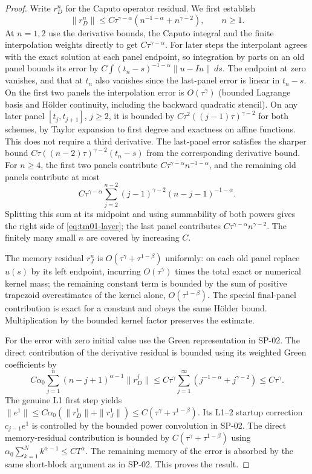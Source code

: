 \documentclass[11pt,a4paper]{amsart}
\theoremstyle{remark}
\theoremstyle{plain}
\theoremstyle{remark}
\numberwithin{equation}{section}
\begin{document}
\begin{proof}
Write $r_D^n$ for the Caputo operator residual. We first establish
\begin{equation}\label{eq:tm01-layer}
 \|r_D^n\|\le C\tau^{\gamma-\alpha}(n^{-1-\alpha}+n^{\gamma-2}),\qquad n\ge1.
\end{equation}
At $n=1,2$ use the derivative bounds, the Caputo integral and the finite interpolation weights directly to get $C\tau^{\gamma-\alpha}$. For later steps the interpolant agrees with the exact solution at each panel endpoint, so integration by parts on an old panel bounds its error by $C\int (t_n-s)^{-1-\alpha}\|u-Iu\|\,ds$. The endpoint at zero vanishes, and that at $t_n$ also vanishes since the last-panel error is linear in $t_n-s$. On the first two panels the interpolation error is $O(\tau^\gamma)$ (bounded Lagrange basis and H\"older continuity, including the backward quadratic stencil). On any later panel $[t_j,t_{j+1}]$, $j\ge2$, it is bounded by $C\tau^2((j-1)\tau)^{\gamma-2}$ for both schemes, by Taylor expansion to first degree and exactness on affine functions. This does not require a third derivative. The last-panel error satisfies the sharper bound $C\tau((n-2)\tau)^{\gamma-2}(t_n-s)$ from the corresponding derivative bound. For $n\ge4$, the first two panels contribute $C\tau^{\gamma-\alpha}n^{-1-\alpha}$, and the remaining old panels contribute at most
\[
 C\tau^{\gamma-\alpha}\sum_{j=2}^{n-2}(j-1)^{\gamma-2}(n-j-1)^{-1-\alpha}.
\]
Splitting this sum at its midpoint and using summability of both powers gives the right side of \eqref{eq:tm01-layer}; the last panel contributes $C\tau^{\gamma-\alpha}n^{\gamma-2}$. The finitely many small $n$ are covered by increasing $C$.

The memory residual $r_J^n$ is $O(\tau^\gamma+\tau^{1-\beta})$ uniformly: on each old panel replace $u(s)$ by its left endpoint, incurring $O(\tau^\gamma)$ times the total exact or numerical kernel mass; the remaining constant term is bounded by the sum of positive trapezoid overestimates of the kernel alone, $O(\tau^{1-\beta})$. The special final-panel contribution is exact for a constant and obeys the same H\"older bound. Multiplication by the bounded kernel factor preserves the estimate.

For the error with zero initial value use the Green representation in SP-02. The direct contribution of the derivative residual is bounded using its weighted Green coefficients by
\[
 C\alpha_0\sum_{j=1}^n(n-j+1)^{\alpha-1}\|r_D^j\|
 \le C\tau^\gamma\sum_{j=1}^\infty(j^{-1-\alpha}+j^{\gamma-2})\le C\tau^\gamma.
\]
The genuine L1 first step yields $\|e^1\|\le C\alpha_0(\|r_D^1\|+\|r_J^1\|)\le C(\tau^\gamma+\tau^{1-\beta})$. Its L1--2 startup correction $c_{j-1}e^1$ is controlled by the bounded power convolution in SP-02. The direct memory-residual contribution is bounded by $C(\tau^\gamma+\tau^{1-\beta})$ using $\alpha_0\sum_{k=1}^N k^{\alpha-1}\le C T^\alpha$. The remaining memory of the error is absorbed by the same short-block argument as in SP-02. This proves the result.
\end{proof}
\end{document}
